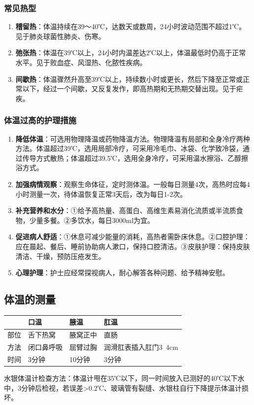 \documentclass[11pt, a4paper]{ctexart}
\begin{document}
\subsubsection{常见热型}
\begin{enumerate}
    \item \textbf{稽留热}：体温持续在39～40℃，达数天或数周，24小时波动范围不超过1℃。见于肺炎球菌性肺炎、伤寒。
    \item \textbf{弛张热}：体温在39℃以上，24小时内温差达2℃以上，体温最低时仍高于正常水平。见于败血症、风湿热、化脓性疾病。
    \item \textbf{间歇热}：体温骤然升高至39℃以上，持续数小时或更长，然后下降至正常或正常以下，经过一个间歇，又反复发作，即高热期和无热期交替出现。见于疟疾。
\end{enumerate}

\subsubsection{体温过高的护理措施}
\begin{enumerate}
    \item \textbf{降低体温}：可选用物理降温或药物降温方法。物理降温有局部和全身冷疗两种方法。体温超过39℃，选用局部冷疗，可采用冷毛巾、冰袋、化学致冷袋，通过传导方式散热；体温超过39.5℃，选用全身冷疗，可采用温水擦浴、乙醇擦浴方式。
    \item \textbf{加强病情观察}：观察生命体征，定时测体温。一般每日测量4次，高热时应每4小时测量一次，待体温恢复正常3天后，改为每日1-2次。
    \item \textbf{补充营养和水分}：①给予高热量、高蛋白、高维生素易消化流质或半流质食物，少量多餐。②多饮水，每日3000ml为宜。
    \item \textbf{促进病人舒适}：①休息可减少能量的消耗，高热者需卧床休息。②口腔护理：应在晨起、餐后、睡前协助病人漱口，保持口腔清洁。③皮肤护理：保持皮肤清洁、干燥，预防压疮发生。
    \item \textbf{心理护理}：护士应经常探视病人，耐心解答各种问题、给予精神安慰。
\end{enumerate}

\subsection{体温的测量}
\begin{table}[htbp]
\centering
\begin{tabular}{|l|l|l|l|}
\hline
 & \textbf{口温} & \textbf{腋温} & \textbf{肛温} \\
\hline
部位 & 舌下热窝 & 腋窝正中 & 直肠 \\
方法 & 闭口鼻呼吸 & 屈臂过胸 & 润滑肛表插入肛门3~4cm \\
时间 & 3分钟 & 10分钟 & 3分钟 \\
\hline
\end{tabular}
\end{table}
水银体温计检查方法：体温计甩在35℃以下，同一时间放入已测好的40℃以下水中，3分钟后检视，若误差>0.2℃、玻璃管有裂缝、水银柱自行下降提示体温计损坏。
\end{document}
